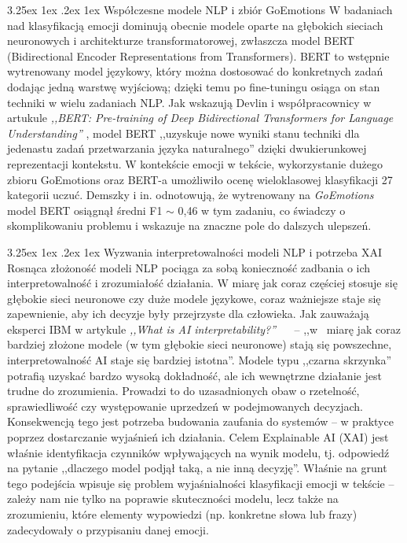 \documentclass[wmii, inf, mgr]{uwmthesis}
\makeatletter
\renewcommand\paragraph{\@startsection{paragraph}{4}{\z@}%
  {3.25ex \@plus1ex \@minus.2ex}%
  {1ex}%
  {\normalfont\normalsize\bfseries}}
\makeatother
\begin{document}
\paragraph{Współczesne modele NLP i zbiór GoEmotions}
W badaniach nad klasyfikacją emocji dominują obecnie modele oparte na głębokich sieciach neuronowych i architekturze transformatorowej, zwłaszcza model BERT (Bidirectional Encoder Representations from Transformers). BERT to wstępnie wytrenowany model językowy, który można dostosować do konkretnych zadań dodając jedną warstwę wyjściową; dzięki temu po fine-tuningu osiąga on stan techniki w wielu zadaniach NLP. Jak wskazują Devlin i współpracownicy w artukule \textit{,,BERT: Pre-training of Deep Bidirectional Transformers for Language Understanding''} \cite{BERT}, model BERT ,,uzyskuje nowe wyniki stanu techniki dla jedenastu zadań przetwarzania języka naturalnego'' dzięki dwukierunkowej reprezentacji kontekstu. W kontekście emocji w tekście, wykorzystanie dużego zbioru GoEmotions oraz BERT-a umożliwiło ocenę wieloklasowej klasyfikacji 27 kategorii uczuć. Demszky i in. odnotowują, że wytrenowany na \textit{GoEmotions} model BERT osiągnął średni F1 $\sim$ 0,46 w tym zadaniu, co świadczy o skomplikowaniu problemu i wskazuje na znaczne pole do dalszych ulepszeń.

\paragraph{Wyzwania interpretowalności modeli NLP i potrzeba XAI}
Rosnąca złożoność modeli NLP pociąga za sobą konieczność zadbania o ich interpretowalność i zrozumiałość działania. W miarę jak coraz częściej stosuje się głębokie sieci neuronowe czy duże modele językowe, coraz ważniejsze staje się zapewnienie, aby ich decyzje były przejrzyste dla człowieka. Jak zauważają eksperci IBM w artykule \textit{,,What is AI interpretability?''}~ \cite{IBM}~ -- ,,w~ miarę jak coraz bardziej złożone modele (w tym głębokie sieci neuronowe) stają się powszechne, interpretowalność AI staje się bardziej istotna''. Modele typu ,,czarna skrzynka'' potrafią uzyskać bardzo wysoką dokładność, ale ich wewnętrzne działanie jest trudne do zrozumienia. Prowadzi to do uzasadnionych obaw o rzetelność, sprawiedliwość czy występowanie uprzedzeń w podejmowanych decyzjach. Konsekwencją tego jest potrzeba budowania zaufania do systemów -- w praktyce poprzez dostarczanie wyjaśnień ich działania. Celem Explainable AI (XAI) jest właśnie identyfikacja czynników wpływających na wynik modelu, tj. odpowiedź na pytanie ,,dlaczego model podjął taką, a nie inną decyzję''. Właśnie na grunt tego podejścia wpisuje się problem wyjaśnialności klasyfikacji emocji w tekście -- zależy nam nie tylko na poprawie skuteczności modelu, lecz także na zrozumieniu, które elementy wypowiedzi (np. konkretne słowa lub frazy) zadecydowały o przypisaniu danej emocji.
\end{document}

